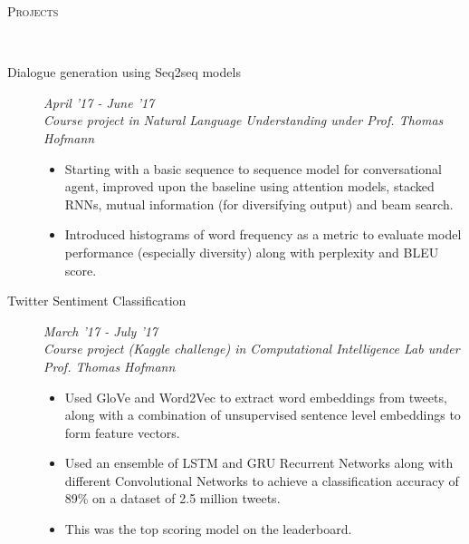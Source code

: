 \documentclass[9pt]{article}
\newenvironment{changemargin}[2]{%
  \begin{list}{}{%
    \setlength{\topsep}{0pt}%
    \setlength{\leftmargin}{#1}%
    \setlength{\rightmargin}{#2}%
    \setlength{\listparindent}{\parindent}%
    \setlength{\itemindent}{\parindent}%
    \setlength{\parsep}{\parskip}%
  }%
  \item[]}{\end{list}
}
\newcommand{\lineover}{
	\begin{changemargin}{-0.05in}{-0.10in}
		\vspace*{-9pt}
		\hrulefill \\
		\vspace*{-2pt}
	\end{changemargin}
}
\newcommand{\header}[1]{
	\begin{changemargin}{-0.5in}{-0.5in}
		\scshape{#1}\\
  	\lineover
	\end{changemargin}
}
\newenvironment{body} {
	\vspace*{-16pt}
	\begin{changemargin}{-0.6in}{-0.65in}
  }	
	{\end{changemargin}
}
\begin{document}
\header{Projects}
\begin{body}
	\vspace{14pt}
	
	\begin{description}
      
      \item[\normalsize{Dialogue generation using Seq2seq models}]
      \hfill \textit{April '17 - June '17} \\
      \textit{Course project in Natural Language Understanding under Prof. Thomas Hofmann}
      \begin{itemize}
      	\item Starting with a basic sequence to sequence model for conversational agent,
      	improved upon the baseline using attention models, stacked RNNs, mutual information (for diversifying output) and beam search.
      	\item Introduced histograms of word frequency as a metric to evaluate model 
      	performance (especially diversity) along with perplexity and BLEU score.
      \end{itemize}
      
      
     \item[\normalsize{Twitter Sentiment Classification}] 
     \hfill	 \textit{March '17 - July '17} \\
     \textit{Course project (Kaggle challenge) in Computational Intelligence Lab under Prof. Thomas Hofmann}
     \begin{itemize}
     	\item Used GloVe and Word2Vec to extract word embeddings from tweets, along
     	with a combination of unsupervised sentence level embeddings to form feature
     	vectors.
     	\item Used an ensemble of LSTM and GRU Recurrent Networks along with different Convolutional Networks to achieve a classification accuracy of 89\% on a dataset of 2.5 million tweets. 
     	\item This was the top scoring model on the leaderboard. 
     \end{itemize}
 

\end{description}
\end{body}
\end{document}
